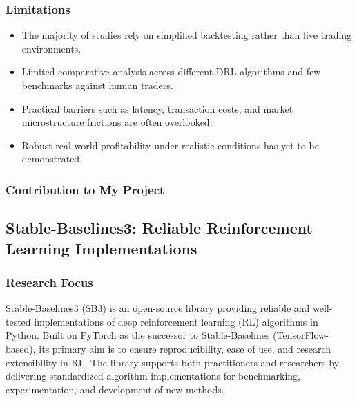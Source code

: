 \documentclass[12pt,a4paper]{report}
\begin{document}
\subsubsection{Limitations}
\begin{itemize}
    \item The majority of studies rely on simplified backtesting rather than live trading environments.  
    \item Limited comparative analysis across different DRL algorithms and few benchmarks against human traders.  
    \item Practical barriers such as latency, transaction costs, and market microstructure frictions are often overlooked.  
    \item Robust real-world profitability under realistic conditions has yet to be demonstrated.  
\end{itemize}

\subsubsection{Contribution to My Project}



\subsection{Stable-Baselines3: Reliable Reinforcement Learning Implementations \cite{raffin2021stable}}

\subsubsection{Research Focus}
Stable-Baselines3 (SB3) is an open-source library providing reliable and well-tested implementations of deep reinforcement learning (RL) algorithms in Python. Built on PyTorch as the successor to Stable-Baselines (TensorFlow-based), its primary aim is to ensure reproducibility, ease of use, and research extensibility in RL. The library supports both practitioners and researchers by delivering standardized algorithm implementations for benchmarking, experimentation, and development of new methods.
\end{document}
